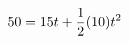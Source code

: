 \documentclass[preview]{standalone}
\begin{document}
\begin{align*}
\special{dvisvgm:raw <g id='unique000'>}50 = 15t + \frac{1}{2}(10)t^2\special{dvisvgm:raw </g>}
\end{align*}
\end{document}
